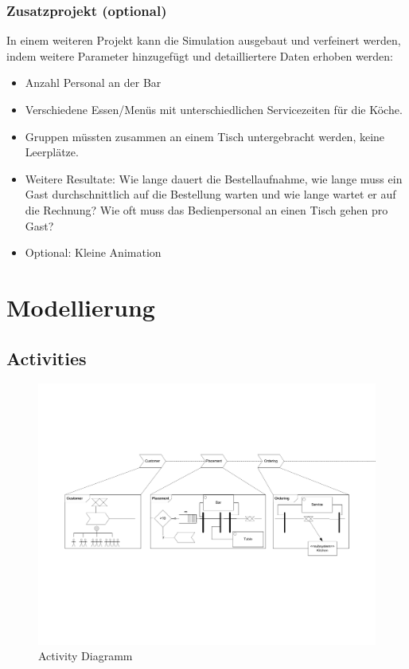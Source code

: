 \documentclass[ngerman,a4paper,12pt]{scrreprt}
\begin{document}
\subsection{Zusatzprojekt (optional)}
	In einem weiteren Projekt kann die Simulation ausgebaut und verfeinert werden, indem weitere Parameter hinzugefügt  und detailliertere Daten erhoben werden:
	\begin{itemize}
		\item Anzahl Personal an der Bar
		\item Verschiedene Essen/Menüs mit unterschiedlichen Servicezeiten für die Köche.
		\item Gruppen müssten zusammen an einem Tisch untergebracht werden, keine Leerplätze.
		\item Weitere Resultate: Wie lange dauert die Bestellaufnahme, wie lange muss ein Gast durchschnittlich auf die Bestellung warten und wie lange wartet er auf die Rechnung? Wie oft muss das Bedienpersonal an einen Tisch gehen pro Gast?
		\item Optional: Kleine Animation
	\end{itemize}


\chapter{Modellierung}
	\section{Activities}
		\begin{figure}[H]
			\centering
				\includegraphics[page=4,trim=1cm 3cm 2.5cm 1cm, clip=true,width=\textwidth]{../model/Modell_v2.pdf}
				\caption[Activity Diagramm]{Activity Diagramm}
				\label{activityDiagramm}
		\end{figure}
		
\end{document}
